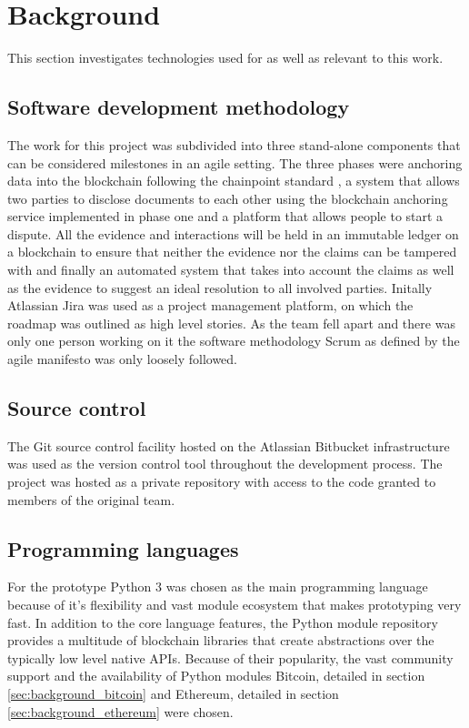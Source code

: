 \documentclass[12pt,msc,a4paper,oneside]{ucl_thesis}
\begin{document}
\section{Background} \label{sec:background}
This section investigates technologies used for as well as relevant to this work.

\subsection{Software development methodology}
The work for this project was subdivided into three stand-alone components that can be considered milestones in an agile setting. The three phases were anchoring data into the blockchain following the chainpoint standard \cite{chainpoint:vaughan}, a system that allows two parties to disclose documents to each other using the blockchain anchoring service implemented in phase one and a platform that allows people to start a dispute. All the evidence and interactions will be held in an immutable ledger on a blockchain to ensure that neither the evidence nor the claims can be tampered with and finally an automated system that takes into account the claims as well as the evidence to suggest an ideal resolution to all involved parties. 
Initally Atlassian Jira was used as a project management platform, on which the roadmap was outlined as high level stories. As the team fell apart and there was only one person working on it the software methodology Scrum as defined by the agile manifesto was only loosely followed. 

\subsection{Source control}
The Git source control facility hosted on the Atlassian Bitbucket infrastructure was used as the version control tool throughout the development process. The project was hosted as a private repository with access to the code granted to members of the original team.

\subsection{Programming languages}
For the prototype Python 3 was chosen as the main programming language because of it's flexibility and vast module ecosystem that makes prototyping very fast. In addition to the core language features, the Python module repository provides a multitude of blockchain libraries that create abstractions over the typically low level native APIs. Because of their popularity, the vast community support and the availability of Python modules Bitcoin, detailed in section \ref{sec:background_bitcoin} and Ethereum, detailed in section \ref{sec:background_ethereum} were chosen.
\end{document}
